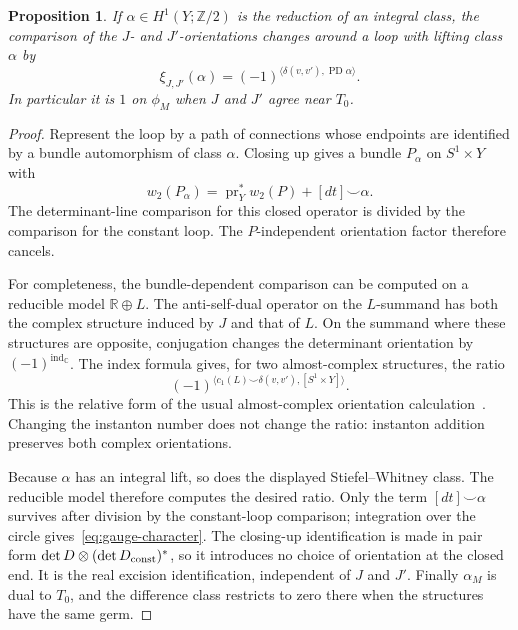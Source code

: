 \documentclass[11pt]{amsart}
\newtheorem{proposition}[theorem]{Proposition}
\theoremstyle{definition}
\theoremstyle{remark}
\theoremstyle{plain}
\numberwithin{equation}{section}
\newcommand{\ZZ}{\mathbb Z}
\newcommand{\RR}{\mathbb R}
\newcommand{\CC}{\mathbb C}
\newcommand{\ind}{\operatorname{ind}}
\newcommand{\PD}{\operatorname{PD}}
\begin{document}
\begin{proposition}\label{prop:character-gauge}
If $\alpha\in H^1(Y;\ZZ/2)$ is the reduction of an integral
class, the comparison of the $J$- and $J'$-orientations changes
around a loop with lifting class $\alpha$ by
\begin{equation}\label{eq:gauge-character}
 \xi_{J,J'}(\alpha)
   =(-1)^{\langle\delta(v,v'),\PD\alpha\rangle}.
\end{equation}
In particular it is $1$ on $\phi_M$ when $J$ and $J'$ agree
near $T_0$.
\end{proposition}
\begin{proof}
Represent the loop by a path of connections whose endpoints
are identified by a bundle automorphism of class $\alpha$.
Closing up gives a bundle $P_\alpha$ on $S^1\times Y$ with
\[
 w_2(P_\alpha)=\operatorname{pr}_Y^*w_2(P)
                  +[dt]\smile\alpha.
\]
The determinant-line comparison for this closed operator is
divided by the comparison for the constant loop. The
$P$-independent orientation factor therefore cancels.

For completeness, the bundle-dependent comparison can be
computed on a reducible model $\RR\oplus L$. The anti-self-dual
operator on the $L$-summand has both the complex structure
induced by $J$ and that of $L$. On the summand where these
structures are opposite, conjugation changes the determinant
orientation by $(-1)^{\ind_{\CC}}$. The index formula gives,
for two almost-complex structures, the ratio
\[
 (-1)^{\langle c_1(L)\smile\delta(v,v'),[S^1\times Y]\rangle}.
\]
This is the relative form of the usual almost-complex
orientation calculation~\cite[Section~3(c) and the proof of Proposition~3.25]{Donaldson87}.
Changing the instanton number does not change the ratio:
instanton addition preserves both complex orientations.

Because $\alpha$ has an integral lift, so does the displayed
Stiefel--Whitney class. The reducible model therefore computes
the desired ratio. Only the term $[dt]\smile\alpha$ survives
after division by the constant-loop comparison; integration
over the circle gives~\eqref{eq:gauge-character}. The
closing-up identification is made in pair form
$\det D\otimes(\det D_{\rm const})^*$, so it introduces no
choice of orientation at the closed end. It is the real
excision identification, independent of $J$ and $J'$.
Finally $\alpha_M$ is dual to $T_0$, and the difference class
restricts to zero there when the structures have the same germ.
\end{proof}
\end{document}
